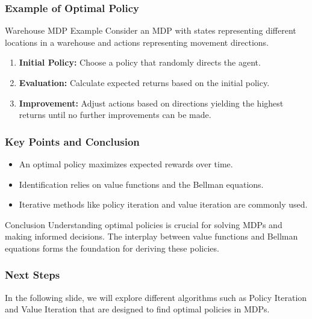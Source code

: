 \documentclass[aspectratio=169]{beamer}
\begin{document}
\begin{frame}[fragile]
    \frametitle{Example of Optimal Policy}
    \begin{block}{Warehouse MDP Example}
        Consider an MDP with states representing different locations in a warehouse and actions representing movement directions.
        \begin{enumerate}
            \item \textbf{Initial Policy:} Choose a policy that randomly directs the agent.
            \item \textbf{Evaluation:} Calculate expected returns based on the initial policy.
            \item \textbf{Improvement:} Adjust actions based on directions yielding the highest returns until no further improvements can be made.
        \end{enumerate}
    \end{block}
\end{frame}

\begin{frame}[fragile]
    \frametitle{Key Points and Conclusion}
    \begin{itemize}
        \item An optimal policy maximizes expected rewards over time.
        \item Identification relies on value functions and the Bellman equations.
        \item Iterative methods like policy iteration and value iteration are commonly used.
    \end{itemize}
    
    \begin{block}{Conclusion}
        Understanding optimal policies is crucial for solving MDPs and making informed decisions. The interplay between value functions and Bellman equations forms the foundation for deriving these policies.
    \end{block}
\end{frame}

\begin{frame}[fragile]
    \frametitle{Next Steps}
    In the following slide, we will explore different algorithms such as Policy Iteration and Value Iteration that are designed to find optimal policies in MDPs.
\end{frame}
\end{document}
